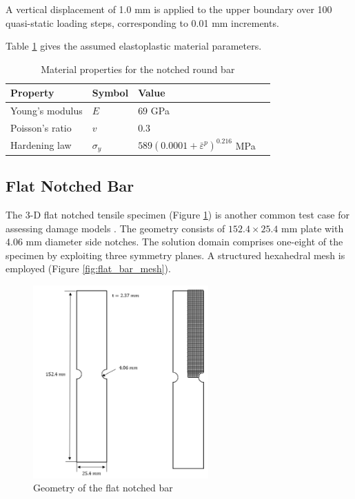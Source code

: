 \documentclass[sn-mathphys,Numbered,draft]{sn-jnl}%
\begin{document}
A vertical displacement of 1.0 \si{\milli\meter} is applied to the upper boundary over 100 quasi-static loading steps, corresponding to 0.01 \si{\milli\meter} increments.

Table \ref{tab:notched_bar_mat} gives the assumed elastoplastic material parameters.
\begin{table}[htb]
	\centering
		\begin{tabular}{llll} \hline
			Property & Symbol & Value  \\ \hline 
			Young's modulus & $E$ & $69$ GPa \\
			Poisson's ratio & $v$ & $0.3$   \\
			Hardening law & $\sigma_y$ & $589({0.0001+\bar{\varepsilon}}^p)^{0.216}$ MPa  \\
			\hline
		\end{tabular}
	\caption{Material properties for the notched round bar}
	\label{tab:notched_bar_mat}
\end{table}



\subsection{Flat Notched Bar}
The 3-D flat notched tensile specimen (Figure \ref{fig:flat_bar_geom}) is another common test case for assessing damage models \citep{borden_phase-field_2016, eldahshan_phase_2021}.
The geometry consists of $152.4 \times 25.4$ \si{\milli\meter} plate with 4.06 \si{\milli\meter} diameter side notches.
The solution domain comprises one-eight of the specimen by exploiting three symmetry planes.
A structured hexahedral mesh is employed (Figure \ref{fig:flat_bar_mesh}).

\begin{figure}[htb] \label{fig:flat_bar_geom}
\begin{center}
	\includegraphics[width=0.6\textwidth]{./Figures/finiteVolumeImplementation/inhomogenousDeformation/flatNotchedTensile.png}
\caption{Geometry of the flat notched bar}
\end{center}
\end{figure}
\end{document}
